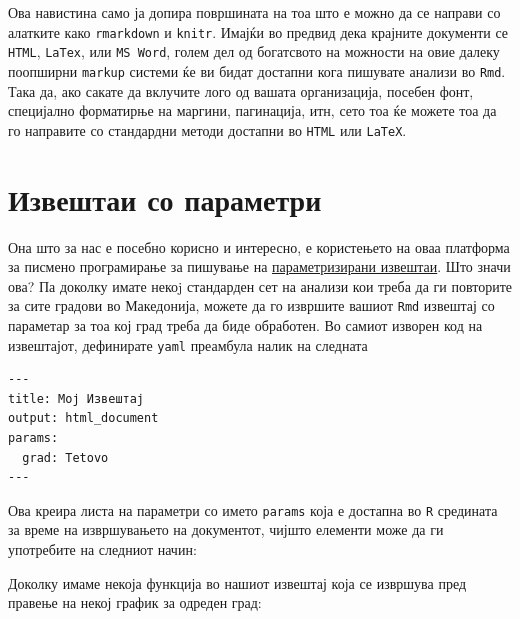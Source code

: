 \documentclass[
]{book}
\newenvironment{Shaded}{\begin{snugshade}}{\end{snugshade}}
\newcommand{\NormalTok}[1]{#1}
\newcommand{\SpecialCharTok}[1]{\textcolor[rgb]{0.00,0.00,0.00}{#1}}
\begin{document}
Ова навистина само ја допира површината на тоа што е можно да се направи со алатките како \texttt{rmarkdown} и \texttt{knitr}. Имајќи во предвид дека крајните документи се \texttt{HTML}, \texttt{LaTex}, или \texttt{MS\ Word}, голем дел од богатсвото на можности на овие далеку поопширни \texttt{markup} системи ќе ви бидат достапни кога пишувате анализи во \texttt{Rmd}. Така да, ако сакате да вклучите лого од вашата организација, посебен фонт, специјално форматирње на маргини, пагинација, итн, сето тоа ќе можете тоа да го направите со стандардни методи достапни во \texttt{HTML} или \texttt{LaTeX}.

\hypertarget{ux438ux437ux432ux435ux448ux442ux430ux438-ux441ux43e-ux43fux430ux440ux430ux43cux435ux442ux440ux438}{%
\section{Извештаи со параметри}\label{ux438ux437ux432ux435ux448ux442ux430ux438-ux441ux43e-ux43fux430ux440ux430ux43cux435ux442ux440ux438}}

Она што за нас е посебно корисно и интересно, е користењето на оваа платформа за писмено програмирање за пишување на \href{https://rmarkdown.rstudio.com/developer_parameterized_reports.html\%23parameter_types\%2F}{параметризирани извештаи}. Што значи ова? Па доколку имате некоj стандарден сет на анализи кои треба да ги повторите за сите градови во Македонија, можете да го извршите вашиот \texttt{Rmd} извештај со параметар за тоа кој град треба да биде обработен. Во самиот изворен код на извештајот, дефинирате \texttt{yaml} преамбула налик на следната

\begin{verbatim}
---
title: Мој Извештај
output: html_document
params:
  grad: Tetovo
---
\end{verbatim}

Ова креира листа на параметри со името \texttt{params} која е достапна во \texttt{R} средината за време на извршувањето на документот, чијшто елементи може да ги употребите на следниот начин:

\begin{Shaded}
\end{Shaded}

Доколку имаме некоја функција во нашиот извештај која се извршува пред правење на некој график за одреден град:
\end{document}
